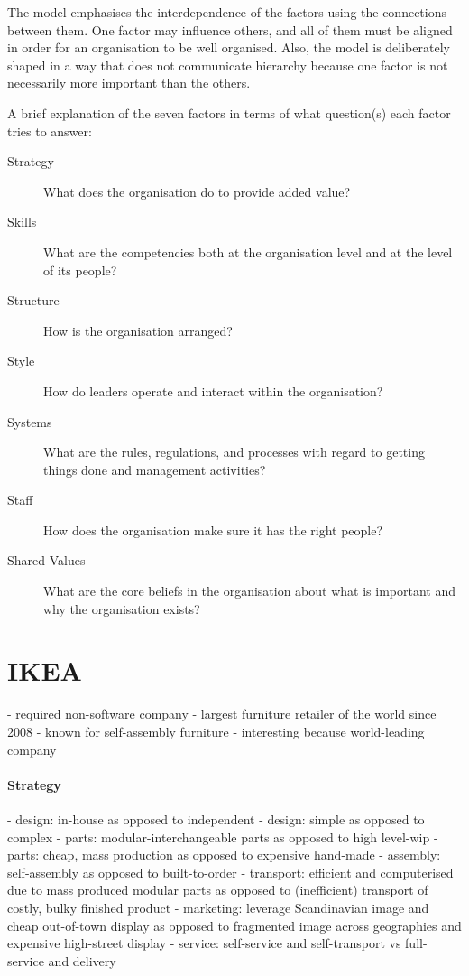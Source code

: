 The model emphasises the interdependence of the factors using the connections between them. One factor may influence others, and all of them must be aligned in order for an organisation to be well organised. Also, the model is deliberately shaped in a way that does not communicate hierarchy because one factor is not necessarily more important than the others.

A brief explanation of the seven factors in terms of what question(s) each factor tries to answer:
\begin{description}
    \item[Strategy] What does the organisation do to provide added value?
    \item[Skills] What are the competencies both at the organisation level and at the level of its people?
    \item[Structure] How is the organisation arranged?
    \item[Style] How do leaders operate and interact within the organisation?
    \item[Systems] What are the rules, regulations, and processes with regard to getting things done and management activities?
    \item[Staff] How does the organisation make sure it has the right people?
    \item[Shared Values] What are the core beliefs in the organisation about what is important and why the organisation exists?
\end{description}

\section{IKEA}
- required non-software company
- largest furniture retailer of the world since 2008
- known for self-assembly furniture
- interesting because world-leading company

\paragraph{Strategy}
\citep{kumar2000market}
- design: in-house as opposed to independent
- design: simple as opposed to complex
- parts: modular-interchangeable parts as opposed to high level-wip
- parts: cheap, mass production as opposed to expensive hand-made
- assembly: self-assembly as opposed to built-to-order
- transport: efficient and computerised due to mass produced modular parts as opposed to (inefficient) transport of costly, bulky finished product
- marketing: leverage Scandinavian image and cheap out-of-town display as opposed to fragmented image across geographies and expensive high-street display
- service: self-service and self-transport vs full-service and delivery

